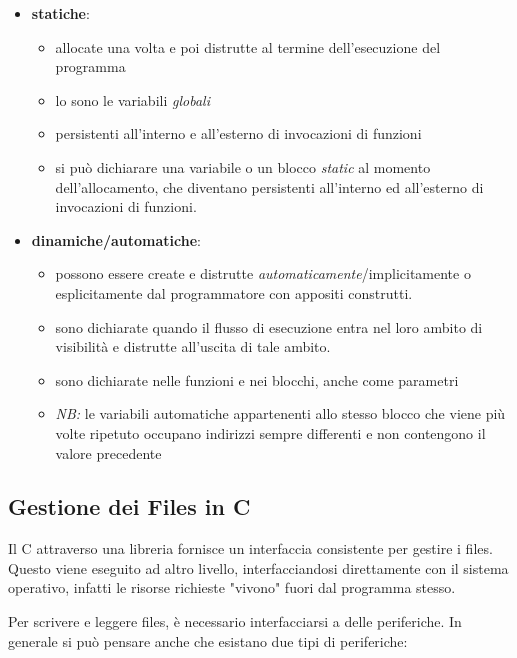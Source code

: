 \documentclass[
]{article}
\begin{document}
\begin{itemize}
\item
  \textbf{statiche}:

  \begin{itemize}
  \item
    allocate una volta e poi distrutte al termine dell'esecuzione del
    programma
  \item
    lo sono le variabili \emph{globali}
  \item
    persistenti all'interno e all'esterno di invocazioni di funzioni
  \item
    si può dichiarare una variabile o un blocco \emph{static} al momento
    dell'allocamento, che diventano persistenti all'interno ed
    all'esterno di invocazioni di funzioni.
  \end{itemize}
\item
  \textbf{dinamiche/automatiche}:

  \begin{itemize}
  \item
    possono essere create e distrutte
    \emph{automaticamente}/implicitamente o esplicitamente dal
    programmatore con appositi construtti.
  \item
    sono dichiarate quando il flusso di esecuzione entra nel loro ambito
    di visibilità e distrutte all'uscita di tale ambito.
  \item
    sono dichiarate nelle funzioni e nei blocchi, anche come parametri
  \item
    \emph{NB:} le variabili automatiche appartenenti allo stesso blocco
    che viene più volte ripetuto occupano indirizzi sempre differenti e
    non contengono il valore precedente
  \end{itemize}
\end{itemize}

\hypertarget{header-n914}{%
\subsection{Gestione dei Files in C}\label{header-n914}}

Il C attraverso una libreria fornisce un interfaccia consistente per
gestire i files. Questo viene eseguito ad altro livello,
interfacciandosi direttamente con il sistema operativo, infatti le
risorse richieste "vivono" fuori dal programma stesso.

Per scrivere e leggere files, è necessario interfacciarsi a delle
periferiche. In generale si può pensare anche che esistano due tipi di
periferiche:
\end{document}
